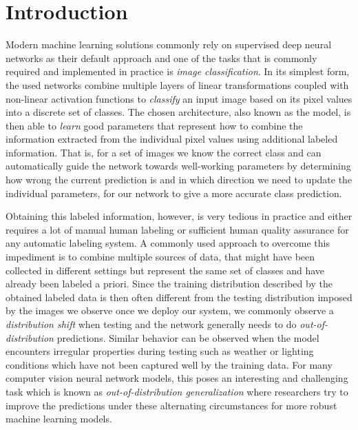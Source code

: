 \chapter{Introduction} 
\label{sec:Introduction}

Modern machine learning solutions commonly rely on supervised deep neural networks as their default approach and one of the tasks that is commonly required and implemented in practice is \emph{image classification}. In its simplest form, the used networks combine multiple layers of linear transformations coupled with non-linear activation functions to \emph{classify} an input image based on its pixel values into a discrete set of classes. The chosen architecture, also known as the model, is then able to \emph{learn} good parameters  that represent how to combine the information extracted from the individual pixel values using additional labeled information. That is, for a set of images we know the correct class and can automatically guide the network towards well-working parameters by determining how wrong the current prediction is and in which direction we need to update the individual parameters, for our network to give a more accurate class prediction. 

Obtaining this labeled information, however, is very tedious in practice and either requires a lot of manual human labeling or sufficient human quality assurance for any automatic labeling system. A commonly used approach to overcome this impediment is to combine multiple sources of data, that might have been collected in different settings but represent the same set of classes and have already been labeled a priori. Since the training distribution described by the obtained labeled data is then often different from the testing distribution imposed by the images we observe once we deploy our system, we commonly observe a \emph{distribution shift} when testing and the network generally needs to do \emph{out-of-distribution} predictions. Similar behavior can be observed when the model encounters irregular properties during testing such as weather or lighting conditions which have not been captured well by the training data. For many computer vision neural network models, this poses an interesting and challenging task which is known as \emph{out-of-distribution generalization} where researchers try to improve the predictions under these alternating circumstances for more robust machine learning models.

